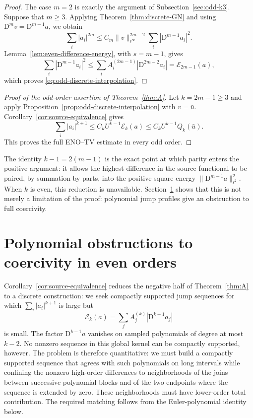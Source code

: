 \documentclass[11pt]{amsart}
\theoremstyle{plain}
\theoremstyle{definition}
\theoremstyle{remark}
\numberwithin{equation}{section}
\theoremstyle{plain}
\begin{document}
\begin{proof}
	The case $m=2$ is exactly the argument of
	Subsection~\ref{sec:odd-k3}.  Suppose that $m\ge3$.  Applying
	Theorem~\ref{thm:discrete-GN} and using
	$\mathrm D^mv=\mathrm D^{m-1}a$, we obtain
	\begin{equation}\label{eq:odd-intermediate-energy}
		\sum_i|a_i|^{2m}
		\le C_m\|v\|_{\ell^\infty}^{2m-2}
		\sum_i|\mathrm D^{m-1}a_i|^2.
	\end{equation}
	Lemma~\ref{lem:even-difference-energy}, with $s=m-1$, gives
	\[
	\sum_i|\mathrm D^{m-1}a_i|^2
	\le\sum_iA_i^{(2m-1)}|\mathrm D^{2m-2}a_i|
	=\mathcal E_{2m-1}(a),
	\]
	which proves \eqref{eq:odd-discrete-interpolation}.
\end{proof}

\begin{proof}[Proof of the odd-order assertion of
	Theorem~\ref{thm:A}]
	Let $k=2m-1\ge3$ and apply
	Proposition~\ref{prop:odd-discrete-interpolation} with $v=\bar u$.
	Corollary~\ref{cor:source-equivalence} gives
	\[
	\sum_i|a_i|^{k+1}
	\le C_kU^{k-1}\mathcal E_k(a)
	\le C_kU^{k-1}Q_k(\bar u).
	\]
	This proves the full ENO--TV estimate in every odd order.
\end{proof}

The identity $k-1=2(m-1)$ is the exact point at which parity enters the
positive argument: it allows the highest difference in the source functional
to be paired, by summation by parts, into the positive square energy
$\|\mathrm D^{m-1}a\|_{\ell^2}^2$.  When $k$ is even, this reduction is
unavailable.  Section~\ref{sec:even-obstruction} shows that this is not merely
a limitation of the proof: polynomial jump profiles give an 
obstruction to full coercivity.


\section{Polynomial obstructions to coercivity in even orders}
\label{sec:even-obstruction}

Corollary~\ref{cor:source-equivalence} reduces the negative half of
Theorem~\ref{thm:A} to a discrete construction: we seek compactly supported
jump sequences for which $\sum_i|a_i|^{k+1}$ is large but
\[
\mathcal E_k(a)
=\sum_j A_j^{(k)}|\mathrm D^{k-1}a_j|
\]
is small.  The factor $\mathrm D^{k-1}a$ vanishes on sampled polynomials of
degree at most $k-2$.  No nonzero sequence in this global kernel can be
compactly supported, however. 
The problem is therefore quantitative: we must build a compactly
supported sequence that agrees with such polynomials on long intervals while
confining the nonzero high-order differences to neighborhoods of the joins
between successive polynomial blocks and of the two endpoints where the
sequence is extended by zero.  These neighborhoods must have lower-order
total contribution. 
The required matching follows from the Euler-polynomial identity
below.
\end{document}

